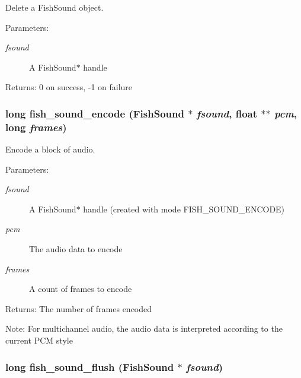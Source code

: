 Delete a Fish\-Sound object. 

\begin{Desc}
\item[Parameters:]
\begin{description}
\item[{\em fsound}]A Fish\-Sound$\ast$ handle \end{description}
\end{Desc}
\begin{Desc}
\item[Returns:]0 on success, -1 on failure \end{Desc}
\subsubsection{\setlength{\rightskip}{0pt plus 5cm}long fish\_\-sound\_\-encode ({\bf Fish\-Sound} $\ast$ {\em fsound}, float $\ast$$\ast$ {\em pcm}, long {\em frames})}\label{fishsound_8h_a8}


Encode a block of audio. 

\begin{Desc}
\item[Parameters:]
\begin{description}
\item[{\em fsound}]A Fish\-Sound$\ast$ handle (created with mode FISH\_\-SOUND\_\-ENCODE) \item[{\em pcm}]The audio data to encode \item[{\em frames}]A count of frames to encode \end{description}
\end{Desc}
\begin{Desc}
\item[Returns:]The number of frames encoded \end{Desc}
\begin{Desc}
\item[Note:]For multichannel audio, the audio data is interpreted according to the current PCM style \end{Desc}
\subsubsection{\setlength{\rightskip}{0pt plus 5cm}long fish\_\-sound\_\-flush ({\bf Fish\-Sound} $\ast$ {\em fsound})}\label{fishsound_8h_a9}


